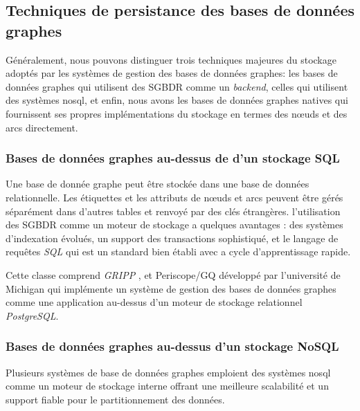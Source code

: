   \subsection{Techniques de persistance des bases de données graphes}
  \label{sec:persistence}
  Généralement, nous pouvons distinguer trois techniques majeures du
  stockage adoptés par les systèmes de gestion des bases de données
  graphes: les bases de données graphes qui utilisent des
  \acrshort{SGBDR} comme un \emph{backend}, celles qui utilisent des
  systèmes \acrshort{nosql}, et enfin, nous avons les bases de données
  graphes natives qui fournissent ses propres implémentations du
  stockage en termes des nœuds et des arcs directement.

    \newpage
    \subsubsection{Bases de données graphes au-dessus de d'un stockage  SQL}
    \label{sec:graphdb-over-sql}
    Une base de donnée graphe peut être stockée dans une base de
    données relationnelle. Les étiquettes et les attributs de nœuds et
    arcs peuvent être gérés séparément dans d'autres tables et renvoyé
    par des clés étrangères. l'utilisation des \acrshort{SGBDR} comme
    un moteur de stockage a quelques avantages : des systèmes
    d'indexation évolués, un support des transactions sophistiqué, et
    le langage de requêtes \emph{SQL} qui est un standard bien établi
    avec a cycle d'apprentissage rapide.\medskip

    

    Cette classe comprend \emph{GRIPP} \cite{trissl2007fast}, et
    Periscope/GQ \cite{tian2008periscope} développé par l'université
    de Michigan qui implémente un système de gestion des bases de
    données graphes comme une application au-dessus d'un moteur de
    stockage relationnel \emph{PostgreSQL}.


    \subsubsection{Bases de données graphes au-dessus d'un stockage NoSQL}
    \label{sec:graphdb-over-nosql}
    Plusieurs systèmes de base de données graphes emploient des
    systèmes \acrshort{nosql} comme un moteur de stockage interne
    offrant une meilleure scalabilité et un support fiable pour le
    partitionnement des données.\bigskip

